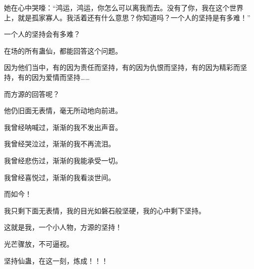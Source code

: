 \begin{this_body}
她在心中哭嚎：“鸿运，鸿运，你怎么可以离我而去。没有了你，我在这个世界上，就是孤家寡人。我活着还有什么意思？你知道吗？一个人的坚持是有多难！”

一个人的坚持会有多难？

在场的所有蛊仙，都能回答这个问题。

因为他们当中，有的因为责任而坚持，有的因为仇恨而坚持，有的因为精彩而坚持，有的因为爱情而坚持……

而方源的回答呢？

他仍旧面无表情，毫无所动地向前进。

我曾经呐喊过，渐渐的我不发出声音。

我曾经哭泣过，渐渐的我不再流泪。

我曾经悲伤过，渐渐的我能承受一切。

我曾经喜悦过，渐渐的我看淡世间。

而如今！

我只剩下面无表情，我的目光如磐石般坚硬，我的心中剩下坚持。

这就是我，一个小人物，方源的坚持！

光芒骤放，不可逼视。

坚持仙蛊，在这一刻，炼成！！！

\end{this_body}
